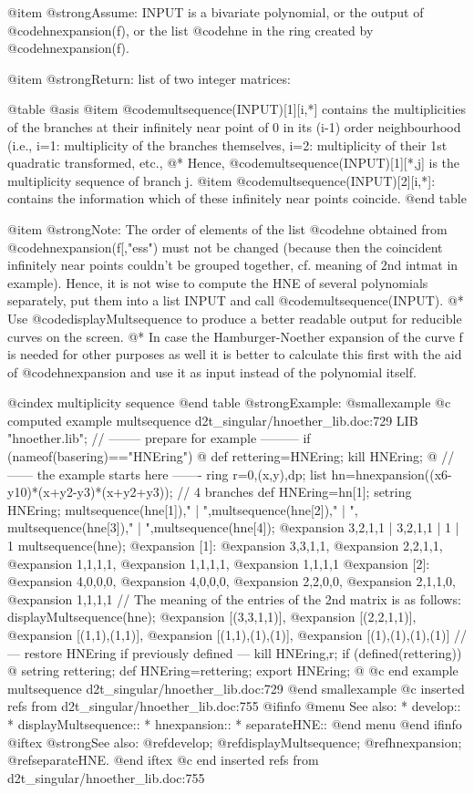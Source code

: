 @item @strong{Assume:}
INPUT is a bivariate polynomial, or the output of @code{hnexpansion(f)},
or the list @code{hne} in the ring created by @code{hnexpansion(f)}.

@item @strong{Return:}
list of two integer matrices:

@table @asis
@item  @code{multsequence(INPUT)[1][i,*]}
   contains the multiplicities of the branches at their infinitely near point
   of 0 in its (i-1) order neighbourhood (i.e., i=1: multiplicity of the
   branches themselves, i=2: multiplicity of their 1st quadratic transformed,
   etc., @*
   Hence, @code{multsequence(INPUT)[1][*,j]} is the multiplicity sequence
   of branch j.
@item  @code{multsequence(INPUT)[2][i,*]}:
   contains the information which of these infinitely near points coincide.
@end table

@item @strong{Note:}
The order of elements of the list @code{hne} obtained from @code{hnexpansion(f[,"ess")}
must not be changed (because then the coincident infinitely near points
couldn't be grouped together, cf. meaning of 2nd intmat in example).
Hence, it is not wise to compute the HNE of several polynomials
separately, put them into a list INPUT and call @code{multsequence(INPUT)}. @*
Use @code{displayMultsequence} to produce a better readable output for
reducible curves on the screen. @*
In case the Hamburger-Noether expansion of the curve f is needed
for other purposes as well it is better to calculate this first
with the aid of @code{hnexpansion} and use it as input instead of
the polynomial itself.

@cindex multiplicity sequence
@end table
@strong{Example:}
@smallexample
@c computed example multsequence d2t_singular/hnoether_lib.doc:729 
LIB "hnoether.lib";
// -------- prepare for example ---------
if (nameof(basering)=="HNEring") @{
def rettering=HNEring;
kill HNEring;
@}
// ------ the example starts here -------
ring r=0,(x,y),dp;
list hn=hnexpansion((x6-y10)*(x+y2-y3)*(x+y2+y3));   // 4 branches
def HNEring=hn[1];
setring HNEring;
multsequence(hne[1]),"  |  ",multsequence(hne[2]),"  |  ",
multsequence(hne[3]),"  |  ",multsequence(hne[4]);
@expansion{} 3,2,1,1   |   3,2,1,1   |   1   |   1
multsequence(hne);
@expansion{} [1]:
@expansion{}    3,3,1,1,
@expansion{}    2,2,1,1,
@expansion{}    1,1,1,1,
@expansion{}    1,1,1,1,
@expansion{}    1,1,1,1 
@expansion{} [2]:
@expansion{}    4,0,0,0,
@expansion{}    4,0,0,0,
@expansion{}    2,2,0,0,
@expansion{}    2,1,1,0,
@expansion{}    1,1,1,1 
// The meaning of the entries of the 2nd matrix is as follows:
displayMultsequence(hne);
@expansion{} [(3,3,1,1)],
@expansion{} [(2,2,1,1)],
@expansion{} [(1,1),(1,1)],
@expansion{} [(1,1),(1),(1)],
@expansion{} [(1),(1),(1),(1)]
// --- restore HNEring if previously defined ---
kill HNEring,r;
if (defined(rettering)) @{
setring rettering;
def HNEring=rettering;
export HNEring;
@}
@c end example multsequence d2t_singular/hnoether_lib.doc:729
@end smallexample
@c inserted refs from d2t_singular/hnoether_lib.doc:755
@ifinfo
@menu
See also:
* develop::
* displayMultsequence::
* hnexpansion::
* separateHNE::
@end menu
@end ifinfo
@iftex
@strong{See also:}
@ref{develop};
@ref{displayMultsequence};
@ref{hnexpansion};
@ref{separateHNE}.
@end iftex
@c end inserted refs from d2t_singular/hnoether_lib.doc:755

